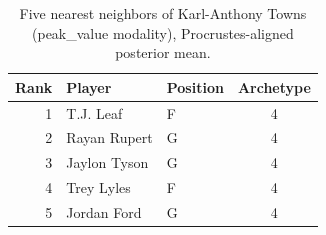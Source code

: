 \begin{table}[htbp]
  \centering\small
  \begin{tabular}{rllc}
    \toprule
    Rank & Player & Position & Archetype \\
    \midrule
    1 & T.J. Leaf & F & 4 \\
    2 & Rayan Rupert & G & 4 \\
    3 & Jaylon Tyson & G & 4 \\
    4 & Trey Lyles & F & 4 \\
    5 & Jordan Ford & G & 4 \\
    \bottomrule
  \end{tabular}
  \caption{Five nearest neighbors of Karl-Anthony Towns (peak_value modality), Procrustes-aligned posterior mean.}
  \label{tab:Karl_Anthony_Towns_neighbors_peak_value}
\end{table}

